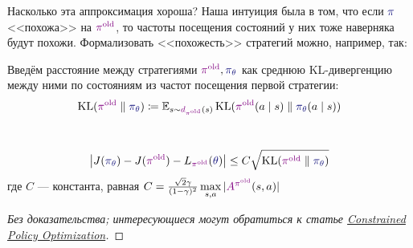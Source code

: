 Насколько эта аппроксимация хороша? Наша интуиция была в том, что если $\textcolor{ChadBlue}{\pi}$ <<похожа>> на $\textcolor{ChadPurple}{\pi^{\old}}$, то частоты посещения состояний у них тоже наверняка будут похожи. Формализовать <<похожесть>> стратегий можно, например, так:
\begin{definition}
Введём расстояние между стратегиями $\textcolor{ChadPurple}{\pi^{\old}}, \textcolor{ChadBlue}{\pi_\theta}$ как среднюю KL-дивергенцию между ними по состояниям из частот посещения первой стратегии:
$$\KL(\textcolor{ChadPurple}{\pi^{\old}} \parallel \textcolor{ChadBlue}{\pi_\theta}) \coloneqq \E_{s \sim \textcolor{ChadPurple}{d_{\pi^{\old}}}(s)} \KL(\textcolor{ChadPurple}{\pi^{\old}}(a \mid s) \parallel \textcolor{ChadBlue}{\pi_\theta}(a \mid s))$$
\end{definition}

\begin{theoremBox}[label=th:Lapproximationestimation]{}
\,
\begin{equation*} 
\left| J(\textcolor{ChadBlue}{\pi_\theta}) - J(\textcolor{ChadPurple}{\pi^{\old}}) - L_{\textcolor{ChadPurple}{\pi^{\old}}}(\textcolor{ChadBlue}{\theta}) \right| \le C \sqrt{\KL(\textcolor{ChadPurple}{\pi^{\old}} \parallel \textcolor{ChadBlue}{\pi_\theta}) }
\end{equation*}
где $C$ --- константа, равная $C \HM= \frac{\sqrt{2} \gamma}{(1 - \gamma)^2} \max\limits_{s, a} |\textcolor{ChadPurple}{A^{\pi^{\old}}}(s, a)|$
\begin{proof}[Без доказательства; интересующиеся могут обратиться к статье \href{https://arxiv.org/pdf/1705.10528.pdf}{Constrained Policy Optimization}]
\end{proof}
\end{theoremBox}

